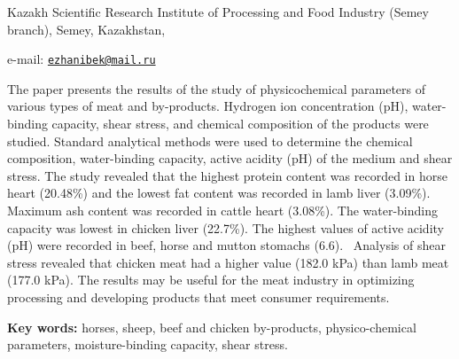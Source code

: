\begin{affiliation}
Kazakh Scientific Research Institute of Processing and Food Industry (Semey branch), Semey, Kazakhstan,

e-mail: \href{mailto:ezhanibek@mail.ru}{\nolinkurl{ezhanibek@mail.ru}}
\end{affiliation}

The paper presents the results of the study of physicochemical
parameters of various types of meat and by-products. Hydrogen ion
concentration (pH), water-binding capacity, shear stress, and chemical
composition of the products were studied. Standard analytical methods
were used to determine the chemical composition, water-binding capacity,
active acidity (pH) of the medium and shear stress. The study revealed
that the highest protein content was recorded in horse heart (20.48\%)
and the lowest fat content was recorded in lamb liver (3.09\%). Maximum
ash content was recorded in cattle heart (3.08\%). The water-binding
capacity was lowest in chicken liver (22.7\%). The highest values of
active acidity (pH) were recorded in beef, horse and mutton stomachs
(6.6). ~Analysis of shear stress revealed that chicken meat had a higher
value (182.0 kPa) than lamb meat (177.0 kPa). The results may be useful
for the meat industry in optimizing processing and developing products
that meet consumer requirements.

{\bfseries Key words:} horses, sheep, beef and chicken by-products,
physico-chemical parameters, moisture-binding capacity, shear stress.


